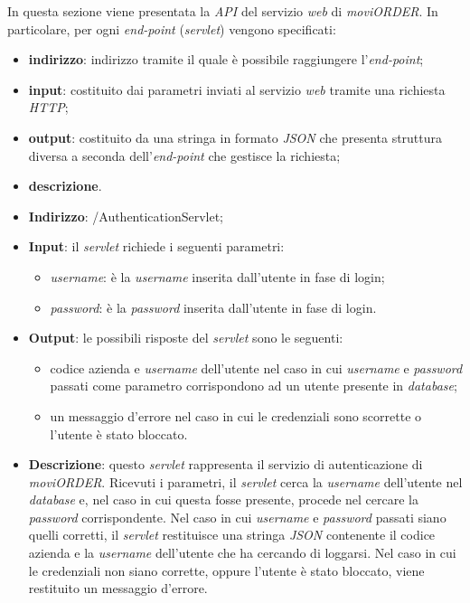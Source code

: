 In questa sezione viene presentata la \textit{API} del servizio \textit{web} di \textit{moviORDER}. In particolare, per ogni \textit{end-point} (\textit{servlet}) vengono specificati:
\begin{itemize}
	\item \textbf{indirizzo}: indirizzo tramite il quale è possibile raggiungere l'\textit{end-point};
	\item \textbf{input}: costituito dai parametri inviati al servizio \textit{web} tramite una richiesta \textit{HTTP};
	\item \textbf{output}: costituito da una stringa in formato \textit{JSON} che presenta struttura diversa a seconda dell'\textit{end-point} che gestisce la richiesta;
	\item \textbf{descrizione}.
\end{itemize}


\begin{itemize}
	\item \textbf{Indirizzo}: /AuthenticationServlet;
	\item \textbf{Input}: il \textit{servlet} richiede i seguenti parametri:
		\begin{itemize}
			\item \textit{username}: è la \textit{username} inserita dall'utente in fase di login;
			\item \textit{password}: è la \textit{password} inserita dall'utente in fase di login.
		\end{itemize}
	\item \textbf{Output}: le possibili risposte del \textit{servlet} sono le seguenti:
		\begin{itemize}
			\item codice azienda e \textit{username} dell'utente nel caso in cui \textit{username} e \textit{password} passati come parametro corrispondono ad un utente presente in \textit{database};
			\item un messaggio d'errore nel caso in cui le credenziali sono scorrette o l'utente è stato bloccato. 
		\end{itemize}
		\item \textbf{Descrizione}: questo \textit{servlet} rappresenta il servizio di autenticazione di \textit{moviORDER}. Ricevuti i parametri, il \textit{servlet} cerca la \textit{username} dell'utente nel \textit{database} e, nel caso in cui questa fosse presente, procede nel cercare la \textit{password} corrispondente. Nel caso in cui \textit{username} e \textit{password} passati siano quelli corretti, il \textit{servlet} restituisce una stringa \textit{JSON} contenente il codice azienda e la \textit{username} dell'utente che ha cercando di loggarsi. Nel caso in cui le credenziali non siano corrette, oppure l'utente è stato bloccato, viene restituito un messaggio d'errore.
\end{itemize}

